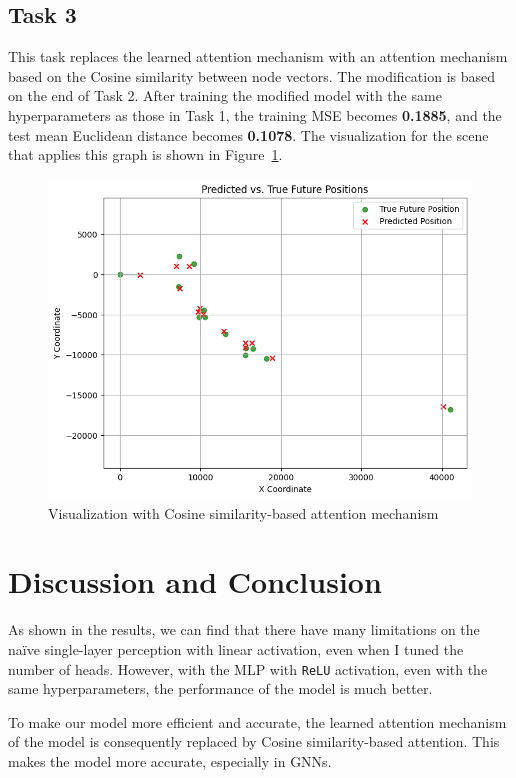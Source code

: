 \documentclass[conference]{IEEEtran}
\begin{document}
\subsection*{Task 3}

This task replaces the learned attention mechanism with an attention mechanism
based on the Cosine similarity between node vectors. The modification is based
on the end of Task 2. After training the modified model with the same
hyperparameters as those in Task 1, the training MSE becomes \textbf{0.1885},
and the test mean Euclidean distance becomes \textbf{0.1078}. The visualization
for the scene that applies this graph is shown in Figure~\ref{fig:visual3}.

\begin{figure}[htbp]
    \centering
    \includegraphics[width=0.8\linewidth]{figvisual3.png}
    \caption{Visualization with Cosine similarity-based attention mechanism}
    \label{fig:visual3}
\end{figure}

\section{Discussion and Conclusion}

As shown in the results, we can find that there have many limitations on the
naïve single-layer perception with linear activation, even when I tuned the
number of heads. However, with the MLP with \texttt{ReLU} activation, even with
the same hyperparameters, the performance of the model is much better.

To make our model more efficient and accurate, the learned attention mechanism
of the model is consequently replaced by Cosine similarity-based
attention. This makes the model more accurate, especially in GNNs.
\end{document}
